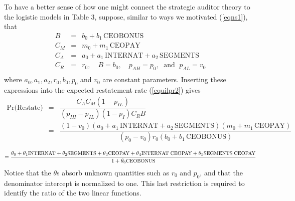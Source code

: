 To have a better sense of how one might connect the strategic auditor theory to the
logistic models in Table 3, suppose, similar to ways we motivated (\ref{eqns1}), that 
\begin{equation}\begin{array}{lcl}\label{eqns1}
B & = & b_0 + b_1 \, \mbox{CEOBONUS} \\[.5em]
C_M & = & m_0 + m_1 \, \mbox{CEOPAY} \\[.5em]
C_A & = & a_0 + a_1 \, \mbox{INTERNAT} + a_2 \, \mbox{SEGMENTS}\\[.5em]
C_R & = & r_0, \quad B  =  b_0, \quad p_{AH}   =  p_0, \; \mbox{ and } \; p_{AL}  =  v_0 \\[.5em]
\end{array}
\end{equation}
where $ a_0, a_1, a_2, r_0, b_0, p_0$ and $v_0$ are constant parameters. 
Inserting these expressions into the expected restatement rate (\ref{equilpr2}) gives
\begin{equation*} \label{equilpr3}
\begin{array}{lcl}
\mbox{Pr(Restate)}& = &  \dfrac{C_AC_M(1-p_{IL})}{(p_{IH}-p_{IL})(1-p_I)C_RB}\\[2em]
& = & \dfrac{(1-v_0)(a_0 + a_1 \, \mbox{INTERNAT} + a_2 \, \mbox{SEGMENTS})(m_0 + m_1 \, \mbox{CEOPAY})}
{(p_0-v_0)r_0(b_0 + b_1 \, \mbox{CEOBONUS})}\\[2em]
\end{array}
\end{equation*}
\begin{equation}\label{equilpr4}
 =  \dfrac{\theta_0 + \theta_1\mbox{\small INTERNAT} + \theta_2\mbox{\small SEGMENTS} + \theta_3\mbox{\small CEOPAY}
+ \theta_4\mbox{\small INTERNAT}\; \mbox{\small CEOPAY}+ \theta_5\mbox{\small SEGMENTS}\; \mbox{\small CEOPAY}}
{1 +  \theta_6\mbox{\small CEOBONUS}}
\end{equation}
Notice that the $\theta$s absorb unknown quantities such as $r_0$ and $p_0$, and that the denominator intercept
is normalized to one. This last restriction is required to identify the ratio of the two linear functions.


